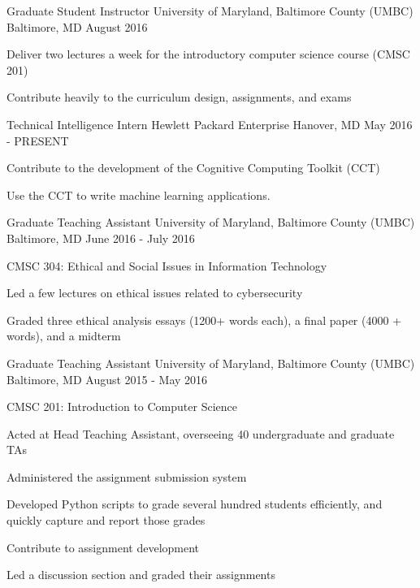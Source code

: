 \begin{cventries}

\cventry
{Graduate Student Instructor}
{University of Maryland, Baltimore County (UMBC)}
{Baltimore, MD}
{August 2016}
{
    \begin{cvitems}
        \item{Deliver two lectures a week for the introductory computer science course (CMSC 201)}
        \item{Contribute heavily to the curriculum design, assignments, and exams}
    \end{cvitems}
}

\cventry
{Technical Intelligence Intern}
{Hewlett Packard Enterprise}
{Hanover, MD}
{May 2016 - PRESENT}
{
    \begin{cvitems}
        \item{Contribute to the development of the Cognitive Computing Toolkit (CCT)}
        \item{Use the CCT to write machine learning applications.}
    \end{cvitems}
}

\cventry
{Graduate Teaching Assistant}
{University of Maryland, Baltimore County (UMBC)}
{Baltimore, MD}
{June 2016 - July 2016}
{
    \begin{cvitems}
        \item {CMSC 304: Ethical and Social Issues in Information Technology}
        \item{Led a few lectures on ethical issues related to cybersecurity}
        \item{Graded three ethical analysis essays (1200+ words each), a final paper (4000 + words), and a midterm}
    \end{cvitems}
}

\cventry
{Graduate Teaching Assistant}
{University of Maryland, Baltimore County (UMBC)}
{Baltimore, MD}
{August 2015 - May 2016}
{
    \begin{cvitems}
        \item{CMSC 201: Introduction to Computer Science}
        \item {Acted at Head Teaching Assistant, overseeing 40 undergraduate and graduate TAs}
        \item {Administered the assignment submission system}
        \item {Developed Python scripts to grade several hundred students efficiently, and quickly capture and report those grades}
        \item {Contribute to assignment development}
        \item{Led a discussion section and graded their assignments}
    \end{cvitems}
}


\end{cventries}
